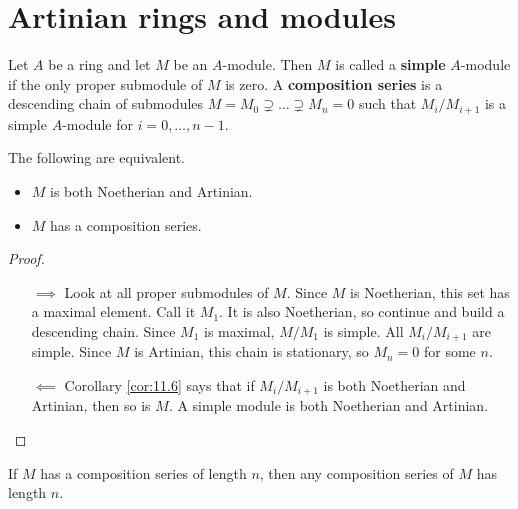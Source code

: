 \pagebreak

\section{Artinian rings and modules}


\begin{definition}
Let $ A $ be a ring and let $ M $ be an $ A $-module. Then $ M $ is called a \textbf{simple} $ A $-module if the only proper submodule of $ M $ is zero. A \textbf{composition series} is a descending chain of submodules $ M = M_0 \supsetneq \dots \supsetneq M_n = 0 $ such that $ M_i / M_{i + 1} $ is a simple $ A $-module for $ i = 0, \dots, n - 1 $.
\end{definition}

\begin{proposition}
The following are equivalent.
\begin{itemize}
\item $ M $ is both Noetherian and Artinian.
\item $ M $ has a composition series.
\end{itemize}
\end{proposition}

\begin{proof}
\hfill
\begin{itemize}
\item[$ \implies $] Look at all proper submodules of $ M $. Since $ M $ is Noetherian, this set has a maximal element. Call it $ M_1 $. It is also Noetherian, so continue and build a descending chain. Since $ M_1 $ is maximal, $ M / M_1 $ is simple. All $ M_i / M_{i + 1} $ are simple. Since $ M $ is Artinian, this chain is stationary, so $ M_n = 0 $ for some $ n $.
\item[$ \impliedby $] Corollary \ref{cor:11.6} says that if $ M_i / M_{i + 1} $ is both Noetherian and Artinian, then so is $ M $. A simple module is both Noetherian and Artinian.
\end{itemize}
\end{proof}

\begin{proposition}
If $ M $ has a composition series of length $ n $, then any composition series of $ M $ has length $ n $.
\end{proposition}


